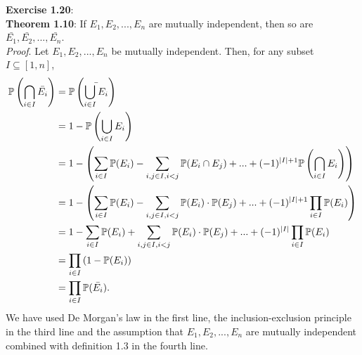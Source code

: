 \textbf{Exercise 1.20}: \\[0.2cm]
\textbf{Theorem 1.10}: If $E_1, E_2, ..., E_n$ are mutually independent, then so
are $\bar{E_1}, \bar{E_2}, ..., \bar{E_n}$. \\[0.2cm]
\textit{Proof}. Let $E_1, E_2, ..., E_n$ be mutually independent. Then, for any
subset $I \subseteq [1, n]$,
\begin{align*}
  \mathbb{P}\left(\bigcap_{i \in I} \bar{E_i}\right)
    &= \mathbb{P}\left(\bar{\bigcup_{i \in I} E_i}\right) \\
    &= 1 - \mathbb{P}\left(\bigcup_{i \in I} E_i\right) \\
    &= 1 - \left( \sum_{i \in I}\mathbb{P}(E_i) - \sum_{i,j \in I, i < j} \mathbb{P}(E_i \cap E_j) + ... + (-1)^{|I| + 1}\mathbb{P}\left(\bigcap_{i\in I}E_i\right) \right) \\
    &= 1 - \left( \sum_{i \in I} \mathbb{P}(E_i) - \sum_{i,j \in I, i < j} \mathbb{P}(E_i) \cdot \mathbb{P}(E_j) + ... + (-1)^{|I| + 1}\prod_{i\in I} \mathbb{P}(E_i) \right) \\
    &= 1 - \sum_{i \in I}\mathbb{P}(E_i) + \sum_{i,j \in I, i < j} \mathbb{P}(E_i) \cdot \mathbb{P}(E_j) + ... + (-1)^{|I|}\prod_{i\in I} \mathbb{P}(E_i) \\
    &= \prod_{i \in I}\left(1 - \mathbb{P}(E_i)\right) \\
    &= \prod_{i \in I}\mathbb{P}(\bar{E_i}).
\end{align*}
We have used De Morgan's law in the first line, the inclusion-exclusion principle
in the third line and the assumption that $E_1, E_2, ..., E_n$ are mutually
independent combined with definition 1.3 in the fourth line.
\\[0.5cm]
